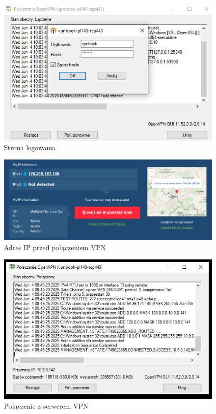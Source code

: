 \documentclass[0.82pt,a4paper]{article}
\begin{document}
    \begin{figure}[H]
        \centering
        \includegraphics[width=0.8\linewidth]{media/OpenVPN/0_logowanie.PNG}
        \caption[]{Strona logowania}
        \label{fig:vpn_strona_logowania}
    \end{figure}

    \begin{figure}[H]
        \centering
        \includegraphics[width=0.8\linewidth]{media/OpenVPN/1_IP_przed_VPN.PNG}
        \caption[]{Adres IP przed połączeniem VPN}
        \label{fig:vpn_ip_przed_vpn}
    \end{figure}
 
    \begin{figure}[H]
        \centering
        \includegraphics[width=0.8\linewidth]{media/OpenVPN/2_polaczenie_z_serwerem.PNG}
        \caption[]{Połączenie z serwerem VPN}
        \label{fig:vpn_polaczenie_z_serwerem}
    \end{figure}
        
\end{document}

